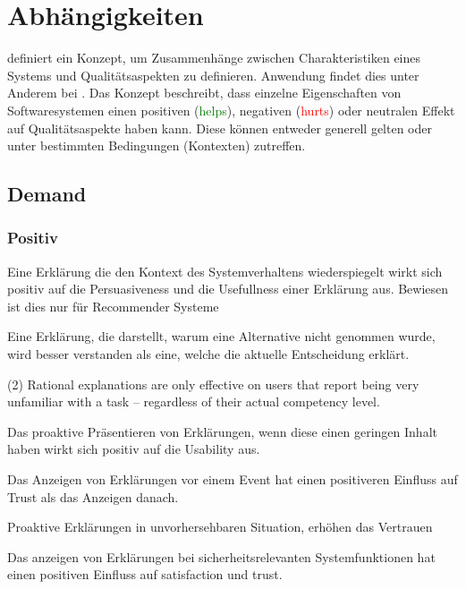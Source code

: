 \section{Abhängigkeiten}

\cite{international2011iso} definiert ein Konzept, um Zusammenhänge zwischen Charakteristiken eines Systems und Qualitätsaspekten zu definieren. Anwendung findet dies unter Anderem bei \cite{carvalho2020developers}. Das Konzept beschreibt, dass einzelne Eigenschaften von Softwaresystemen einen positiven (\textcolor{green}{helps}), negativen (\textcolor{red}{hurts}) oder neutralen Effekt auf Qualitätsaspekte haben kann. Diese können entweder generell gelten oder unter bestimmten Bedingungen (Kontexten) zutreffen.

\subsection*{Demand}

\subsubsection*{Positiv}

Eine Erklärung die den Kontext des Systemverhaltens wiederspiegelt wirkt sich positiv auf die Persuasiveness und die Usefullness einer Erklärung aus. Bewiesen ist dies nur für Recommender Systeme \cite{sato_action-triggering_2019, abdulrahman_belief-based_2019}

Eine Erklärung, die darstellt, warum eine Alternative nicht genommen wurde, wird besser verstanden als eine, welche die aktuelle Entscheidung erklärt. \cite{schrills_color_2020}

(2) Rational explanations are only effective on users that report being very unfamiliar with a task – regardless of their actual competency level. \cite{schaffer_i_2019}

Das proaktive Präsentieren von Erklärungen, wenn diese einen geringen Inhalt haben wirkt sich positiv auf die Usability aus.

Das Anzeigen von Erklärungen vor einem Event hat einen positiveren Einfluss auf Trust als das Anzeigen danach. \cite{haspiel_explanations_2018}

Proaktive Erklärungen in unvorhersehbaren Situation, erhöhen das Vertrauen \cite{zhu_effects_2020}

Das anzeigen von Erklärungen bei sicherheitsrelevanten Systemfunktionen hat einen positiven Einfluss auf satisfaction und trust. \cite{wiegand2019drive}

